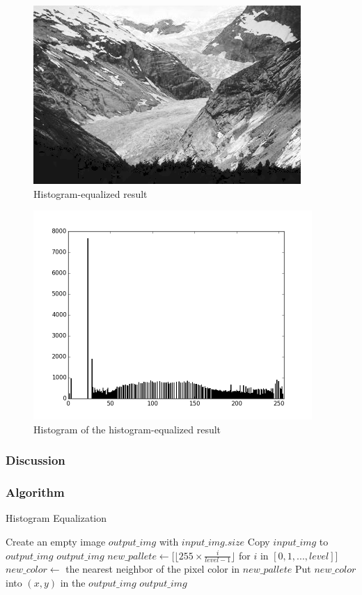 \documentclass{article}
\begin{document}
\begin{figure}[H]
\centering
\includegraphics[width=288pt]{../result/equalize.png}
\caption{Histogram-equalized result}
\end{figure}

\begin{figure}[H]
\centering
\includegraphics[width=300pt]{../result/hist-equalize.png}
\caption{Histogram of the histogram-equalized result}
\end{figure}

\subsubsection{Discussion}

\subsubsection{Algorithm}
\begin{algorithm}[h]
\centering
\caption{Histogram Equalization}
  \begin{algorithmic}[1]
      \State Create an empty image $output\_img$ with $input\_img.size$
      	\State Copy $input\_img$ to $output\_img$
      	\State \Return $output\_img$
      \EndIf
      \State $new\_pallete \gets [\lfloor255 \times \frac{i}{level-1}\rfloor$ for $i$ in $[0, 1, ..., level]$]
      	\State $new\_color \gets$ the nearest neighbor of the pixel color in $new\_pallete$
      	\State Put $new\_color$ into $(x, y)$ in the $output\_img$
      \EndFor
      \State \Return $output\_img$
    \EndFunction
  \end{algorithmic}
\end{algorithm}
\end{document}
